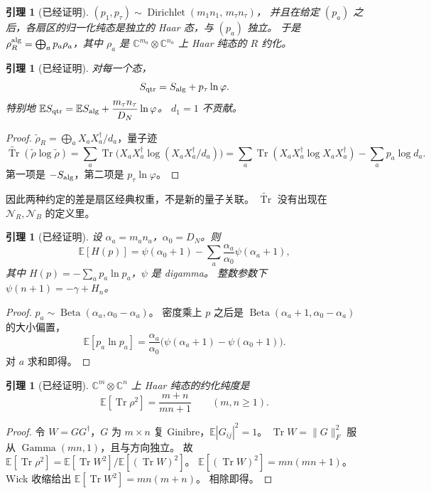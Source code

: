 \documentclass[11pt]{ctexart}
\newtheorem{lemma}[theorem]{引理}
\theoremstyle{definition}
\theoremstyle{remark}
\newcommand{\E}{\mathbb E}
\newcommand{\Tr}{\operatorname{Tr}}
\newcommand{\ph}{\varphi}
\begin{document}
\begin{lemma}[已经证明]
\label{lem:dir}
$(p_1,p_\tau)\sim\operatorname{Dirichlet}(m_1n_1,\,m_\tau n_\tau)$，
并且在给定 $(p_a)$ 之后，各扇区的归一化纯态是独立的 Haar 态，与 $(p_a)$ 独立。
于是 $\rho_R^{\rm alg}=\bigoplus_a p_a\rho_a$，其中 $\rho_a$ 是 $\mathbb C^{m_a}\otimes\mathbb C^{n_a}$ 上 Haar 纯态的 $R$ 约化。
\end{lemma}

\begin{lemma}[已经证明]
\label{lem:sq}
对每一个态，
\[
S_{\rm qtr}=S_{\rm alg}+p_\tau\ln\ph.
\]
特别地 $\E S_{\rm qtr}=\E S_{\rm alg}+\dfrac{m_\tau n_\tau}{D_N}\ln\ph$。
$d_1=1$ 不贡献。
\end{lemma}

\begin{proof}
$\widetilde\rho_R=\bigoplus_a X_aX_a^\dagger/d_a$，量子迹
\[
\widetilde{\Tr}(\widetilde\rho\log\widetilde\rho)
=\sum_a\Tr\bigl(X_aX_a^\dagger\log(X_aX_a^\dagger/d_a)\bigr)
=\sum_a\Tr(X_aX_a^\dagger\log X_aX_a^\dagger)-\sum_a p_a\log d_a.
\]
第一项是 $-S_{\rm alg}$，第二项是 $p_\tau\ln\ph$。
\end{proof}

因此两种约定的差是扇区经典权重，不是新的量子关联。
$\widetilde{\Tr}$ 没有出现在 $\mathcal N_R,\mathcal N_B$ 的定义里。

\begin{lemma}[已经证明]
\label{lem:shannon}
设 $\alpha_a=m_an_a$，$\alpha_0=D_N$。则
\[
\E[H(p)]
=\psi(\alpha_0+1)-\sum_a\frac{\alpha_a}{\alpha_0}\psi(\alpha_a+1),
\]
其中 $H(p)=-\sum_a p_a\ln p_a$，$\psi$ 是 digamma。
整数参数下 $\psi(n+1)=-\gamma+H_n$。
\end{lemma}

\begin{proof}
$p_a\sim\operatorname{Beta}(\alpha_a,\alpha_0-\alpha_a)$。
密度乘上 $p$ 之后是 $\operatorname{Beta}(\alpha_a+1,\alpha_0-\alpha_a)$ 的大小偏置，
\[
\E[p_a\ln p_a]
=\frac{\alpha_a}{\alpha_0}\bigl(\psi(\alpha_a+1)-\psi(\alpha_0+1)\bigr).
\]
对 $a$ 求和即得。
\end{proof}

\begin{lemma}[已经证明]
\label{lem:purity}
$\mathbb C^m\otimes\mathbb C^n$ 上 Haar 纯态的约化纯度是
\[
\E[\Tr\rho^2]=\frac{m+n}{mn+1}\qquad(m,n\ge 1).
\]
\end{lemma}

\begin{proof}
令 $W=GG^\dagger$，$G$ 为 $m\times n$ 复 Ginibre，$\E|G_{ij}|^2=1$。
$\Tr W=\|G\|_F^2$ 服从 $\operatorname{Gamma}(mn,1)$，且与方向独立。
故 $\E[\Tr\rho^2]=\E[\Tr W^2]/\E[(\Tr W)^2]$。
$\E[(\Tr W)^2]=mn(mn+1)$。
Wick 收缩给出 $\E[\Tr W^2]=mn(m+n)$。
相除即得。
\end{proof}
\end{document}
